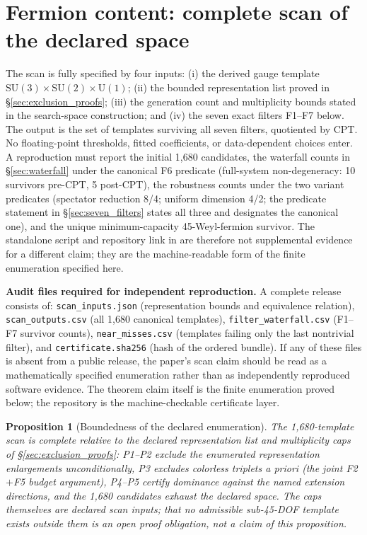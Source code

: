 \documentclass[11pt]{article}
\newtheorem{proposition}[theorem]{Proposition}
\theoremstyle{definition}
\newcommand{\SU}{\mathrm{SU}}
\newcommand{\U}{\mathrm{U}}
\begin{document}
\section{Fermion content: complete scan of the declared space}
\label{sec:fermion_scan}

\begin{tcolorbox}[apfbox, title={Reproducibility contract for the 1{,}680-template scan}]
\footnotesize
The scan is fully specified by four inputs: (i) the derived gauge template
$\SU(3)\times\SU(2)\times\U(1)$; (ii) the bounded representation list
proved in \S\ref{sec:exclusion_proofs}; (iii) the generation count and
multiplicity bounds stated in the search-space construction; and (iv) the
seven exact filters F1--F7 below.  The output is the set of templates
surviving all seven filters, quotiented by CPT.  No floating-point
thresholds, fitted coefficients, or data-dependent choices enter.  A
reproduction must report the initial 1{,}680 candidates, the waterfall
counts in \S\ref{sec:waterfall} under the canonical F6 predicate
(full-system non-degeneracy: 10 survivors pre-CPT, 5 post-CPT), the
robustness counts under the two variant predicates (spectator
reduction 8/4; uniform dimension 4/2; the predicate statement in
\S\ref{sec:seven_filters} states all three and designates the
canonical one), and the unique minimum-capacity 45-Weyl-fermion
survivor.
The standalone script and repository link in \cite{BrookeFermionScan} are
therefore not supplemental evidence for a different claim; they are the
machine-readable form of the finite enumeration specified here.

\smallskip\noindent\textbf{Audit files required for independent reproduction.}\quad
A complete release consists of: \texttt{scan\_inputs.json} (representation
bounds and equivalence relation), \texttt{scan\_outputs.csv} (all 1{,}680
canonical templates), \texttt{filter\_waterfall.csv} (F1--F7 survivor counts),
\texttt{near\_misses.csv} (templates failing only the last nontrivial filter),
and \texttt{certificate.sha256} (hash of the ordered bundle).  If any of these
files is absent from a public release, the paper's scan claim should be read as
a mathematically specified enumeration rather than as independently reproduced
software evidence.  The theorem claim itself is the finite enumeration proved
below; the repository is the machine-checkable certificate layer.
\end{tcolorbox}

\begin{proposition}[Boundedness of the declared enumeration]
\label{prop:scan_completeness_v35}
The 1{,}680-template scan is complete relative to the declared
representation list and multiplicity caps of
\S\ref{sec:exclusion_proofs}: P1--P2 exclude the enumerated
representation enlargements unconditionally, P3 excludes colorless
triplets a priori (the joint F2$+$F5 budget argument), P4--P5 certify
dominance against the named extension directions, and the 1{,}680
candidates exhaust the declared space.  The caps themselves are declared scan
inputs; that no admissible sub-45-DOF template exists outside them is
an open proof obligation, not a claim of this proposition.
\end{proposition}
\end{document}
